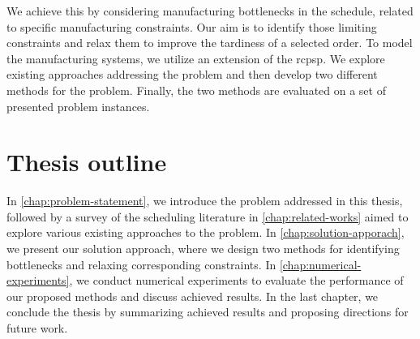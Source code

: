 
We achieve this by considering manufacturing bottlenecks in the schedule,
related to specific manufacturing constraints.
Our aim is to identify those limiting constraints
and relax them to improve the tardiness of a selected order.
To model the manufacturing systems, we utilize an extension of the \acf{rcpsp}.
We explore existing approaches addressing the problem
and then develop two different methods for the problem.
Finally, the two methods are evaluated on a set of presented problem instances.

\section*{Thesis outline} \label{sec:introduction/thesis-outline}

In \cref{chap:problem-statement}, we introduce the problem addressed in this thesis,
followed by a survey of the scheduling literature in \cref{chap:related-works}
aimed to explore various existing approaches to the problem.
In \cref{chap:solution-apporach}, we present our solution approach,
where we design two methods for identifying bottlenecks and relaxing corresponding constraints.
In \cref{chap:numerical-experiments}, we conduct numerical experiments to evaluate the performance
of our proposed methods and discuss achieved results.
In the last chapter, we conclude the thesis by summarizing achieved results
and proposing directions for future work.
